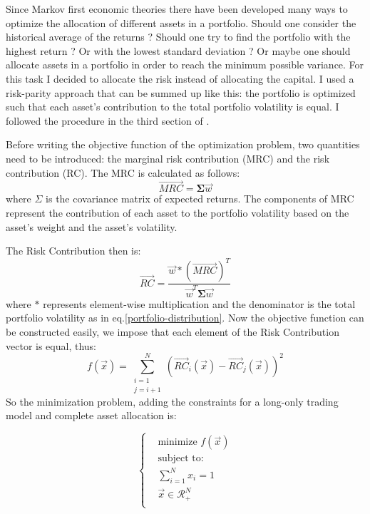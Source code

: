 Since Markov first economic theories there have been developed many ways to optimize the allocation of different assets in a portfolio. Should one consider the historical average of the returns ? Should one try to find the portfolio with the highest return ? Or with the lowest standard deviation ? Or maybe one should allocate assets in a portfolio in order to reach the minimum possible variance. For this task I decided to allocate the risk instead of allocating the capital. I used a risk-parity approach that can be summed up like this: the portfolio is optimized such that each asset's contribution to the total portfolio volatility is equal. I followed the procedure in the third section of \cite{risk-parity-hard}.

Before writing the objective function of the optimization problem, two quantities need to be introduced: the marginal risk contribution (MRC) and the risk contribution (RC). The MRC is calculated as follows:
\begin{equation}
	\vec{\textit{MRC}} = \mathbf{\Sigma}\vec{w}
\end{equation}
where $\Sigma$ is the covariance matrix of expected returns. The components of MRC represent the contribution of each asset to the portfolio volatility based on the asset's weight and the asset's volatility.

The Risk Contribution then is:
\begin{equation}
	\vec{\textit{RC}} = \frac{\vec{w} * (\vec{\textit{MRC}})^T}{\Vec{w}^{T}\mathbf{\Sigma}\Vec{w}}
\end{equation}
where $*$ represents element-wise multiplication and the denominator is the total portfolio volatility as in eq.\eqref{portfolio-distribution}.
Now the objective function can be constructed easily, we impose that each element of the Risk Contribution vector is equal, thus:
\begin{equation}
	f(\vec{x}) = \sum_{\substack{i = 1 \\ j = i + 1}}^{N} (\vec{\textit{RC}}_i (\vec{x}) - \vec{\textit{RC}}_j (\vec{x}))^2 
	\label{risk-parity-objfunc}
\end{equation}
So the minimization problem, adding the constraints for a long-only trading model and complete asset allocation is:

\begin{equation}
	\begin{cases}
		&\text{minimize }  f(\vec{x}) \nonumber \\
		& \text{subject\ to:}\\
		& \sum_{i=1}^N x_i = 1 \nonumber \\
		&\vec{x} \in \mathcal{R}^N_{+} \nonumber \\
	\end{cases}
	\label{V}
\end{equation}


